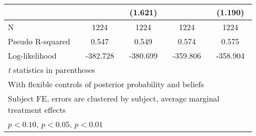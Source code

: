 \begin{table}[htbp]
\begin{tabular}{l*{4}{c}}
                &                  &  (1.621)         &                  &  (1.190)         \\
\hline
N               &     1224         &     1224         &     1224         &     1224         \\
Pseudo R-squared&    0.547         &    0.549         &    0.574         &    0.575         \\
Log-likelihood  & -382.728         & -380.699         & -359.806         & -358.904         \\
\hline\hline
\multicolumn{5}{l}{\footnotesize \textit{t} statistics in parentheses}\\
\multicolumn{5}{l}{\footnotesize With flexible controls of posterior probability and beliefs}\\
\multicolumn{5}{l}{\footnotesize Subject FE, errors are clustered by subject, average marginal treatment effects}\\
\multicolumn{5}{l}{\footnotesize \sym{*} \(p<0.10\), \sym{**} \(p<0.05\), \sym{***} \(p<0.01\)}\\
\end{tabular}
\end{table}
